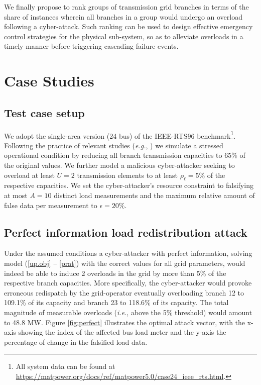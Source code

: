 \documentclass{IEEEtran4PSCC}
\begin{document}
We finally propose to rank groups of transmission grid branches in terms of the share of instances wherein all branches in a group would undergo an overload following a cyber-attack. Such ranking can be used to design effective emergency control strategies for the physical sub-system, so as to alleviate overloads in a timely manner before triggering cascading failure events. 


\section{Case Studies}
\label{casestudy}

\subsection{Test case setup}
We adopt the single-area version (24 bus) of the IEEE-RTS96 benchmark\footnote{All system data can be found at \url{https://matpower.org/docs/ref/matpower5.0/case24_ieee_rts.html}.}. Following the practice of relevant studies (\textit{e.g.}, \cite{yuan2011,liang2015,tian2019}) we simulate a stressed operational condition by reducing  all branch transmission capacities to 65\% of the original values. We further model a malicious cyber-attacker seeking to overload at least $U=2$ transmission elements to at least $\rho_{\ell}=5\%$ of the respective capacities. We set the cyber-attacker's resource constraint to falsifying at most $A=10$ distinct load measurements and the maximum relative amount of false data per measurement to $\epsilon=20\%$. 

\subsection{Perfect information load redistribution attack}

Under the assumed conditions a cyber-attacker with perfect information,  solving model  (\ref{up.obj} -- \ref{prat}) with
the correct values for all grid parameters, would indeed be able to induce 2 overloads in the grid by more than 5\% of the respective branch capacities. More specifically, the cyber-attacker would provoke erroneous redispatch by the grid-operator eventually overloading branch 12 to 109.1\% of its capacity and branch 23 to 118.6\% of its capacity. The total magnitude of measurable overloads (\textit{i.e.}, above the 5\% threshold) would amount to 48.8 MW. Figure \ref{fig:perfect} illustrates the optimal attack vector, with the x-axis showing the index of the affected bus load meter and the y-axis the percentage of change in the falsified load data.
\end{document}
